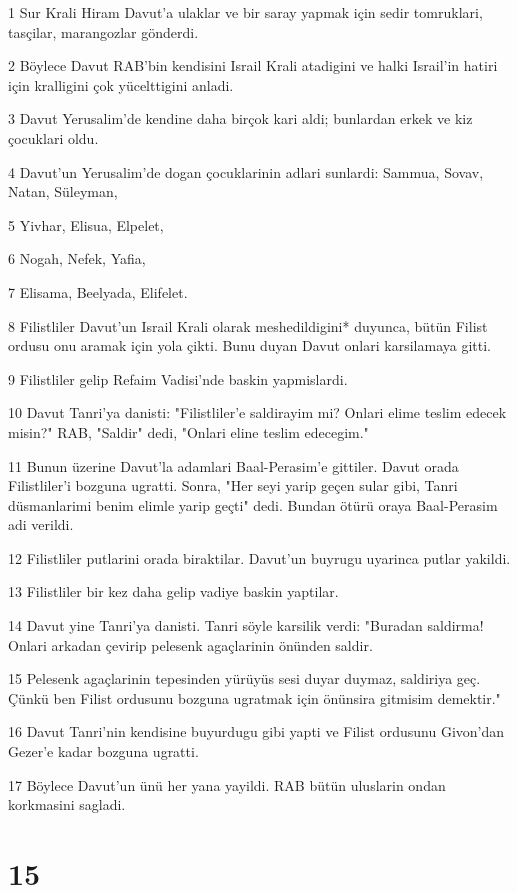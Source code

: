 \par 1 Sur Krali Hiram Davut'a ulaklar ve bir saray yapmak için sedir tomruklari, tasçilar, marangozlar gönderdi.
\par 2 Böylece Davut RAB'bin kendisini Israil Krali atadigini ve halki Israil'in hatiri için kralligini çok yücelttigini anladi.
\par 3 Davut Yerusalim'de kendine daha birçok kari aldi; bunlardan erkek ve kiz çocuklari oldu.
\par 4 Davut'un Yerusalim'de dogan çocuklarinin adlari sunlardi: Sammua, Sovav, Natan, Süleyman,
\par 5 Yivhar, Elisua, Elpelet,
\par 6 Nogah, Nefek, Yafia,
\par 7 Elisama, Beelyada, Elifelet.
\par 8 Filistliler Davut'un Israil Krali olarak meshedildigini* duyunca, bütün Filist ordusu onu aramak için yola çikti. Bunu duyan Davut onlari karsilamaya gitti.
\par 9 Filistliler gelip Refaim Vadisi'nde baskin yapmislardi.
\par 10 Davut Tanri'ya danisti: "Filistliler'e saldirayim mi? Onlari elime teslim edecek misin?" RAB, "Saldir" dedi, "Onlari eline teslim edecegim."
\par 11 Bunun üzerine Davut'la adamlari Baal-Perasim'e gittiler. Davut orada Filistliler'i bozguna ugratti. Sonra, "Her seyi yarip geçen sular gibi, Tanri düsmanlarimi benim elimle yarip geçti" dedi. Bundan ötürü oraya Baal-Perasim adi verildi.
\par 12 Filistliler putlarini orada biraktilar. Davut'un buyrugu uyarinca putlar yakildi.
\par 13 Filistliler bir kez daha gelip vadiye baskin yaptilar.
\par 14 Davut yine Tanri'ya danisti. Tanri söyle karsilik verdi: "Buradan saldirma! Onlari arkadan çevirip pelesenk agaçlarinin önünden saldir.
\par 15 Pelesenk agaçlarinin tepesinden yürüyüs sesi duyar duymaz, saldiriya geç. Çünkü ben Filist ordusunu bozguna ugratmak için önünsira gitmisim demektir."
\par 16 Davut Tanri'nin kendisine buyurdugu gibi yapti ve Filist ordusunu Givon'dan Gezer'e kadar bozguna ugratti.
\par 17 Böylece Davut'un ünü her yana yayildi. RAB bütün uluslarin ondan korkmasini sagladi.

\chapter{15}

